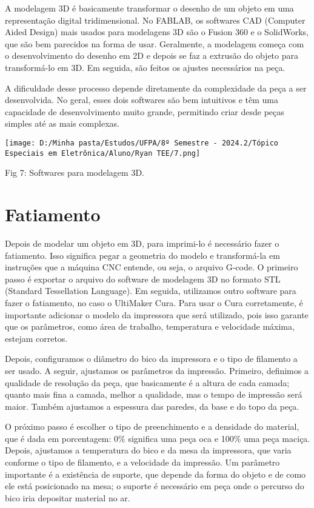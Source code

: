 \documentclass[
]{book}
\begin{document}
A modelagem 3D é basicamente transformar o desenho de um objeto em uma representação digital tridimensional. No FABLAB, os softwares CAD (Computer Aided Design) mais usados para modelagens 3D são o Fusion 360 e o SolidWorks, que são bem parecidos na forma de usar. Geralmente, a modelagem começa com o desenvolvimento do desenho em 2D e depois se faz a extrusão do objeto para transformá-lo em 3D. Em seguida, são feitos os ajustes necessários na peça.

A dificuldade desse processo depende diretamente da complexidade da peça a ser desenvolvida. No geral, esses dois softwares são bem intuitivos e têm uma capacidade de desenvolvimento muito grande, permitindo criar desde peças simples até as mais complexas.

\texttt{[image: D:/Minha pasta/Estudos/UFPA/8º Semestre - 2024.2/Tópico Especiais em Eletrônica/Aluno/Ryan TEE/7.png]}

Fig 7: Softwares para modelagem 3D.

\section{Fatiamento}\label{fatiamento}

Depois de modelar um objeto em 3D, para imprimi-lo é necessário fazer o fatiamento. Isso significa pegar a geometria do modelo e transformá-la em instruções que a máquina CNC entende, ou seja, o arquivo G-code. O primeiro passo é exportar o arquivo do software de modelagem 3D no formato STL (Standard Tessellation Language). Em seguida, utilizamos outro software para fazer o
fatiamento, no caso o UltiMaker Cura. Para usar o Cura corretamente, é importante adicionar o modelo da impressora que será utilizado, pois isso garante que os parâmetros, como área de trabalho, temperatura e velocidade máxima, estejam corretos.

Depois, configuramos o diâmetro do bico da impressora e o tipo de filamento a ser usado. A seguir, ajustamos os parâmetros da impressão. Primeiro, definimos a qualidade de resolução da peça, que basicamente é a altura de cada camada; quanto mais fina a camada, melhor a qualidade, mas o tempo de impressão será maior. Também ajustamos a espessura das paredes, da base e do topo da peça.

O próximo passo é escolher o tipo de preenchimento e a densidade do material, que é dada em porcentagem: 0\% significa uma peça oca e 100\% uma peça maciça. Depois, ajustamos a temperatura do bico e da mesa da impressora, que varia conforme o tipo de filamento, e a velocidade da impressão. Um parâmetro importante é a existência de suporte, que depende da forma do objeto e de como ele está posicionado na mesa; o suporte é necessário em peça onde o percurso do bico iria depositar material no ar.
\end{document}
